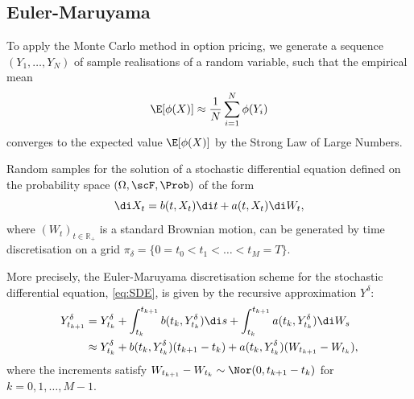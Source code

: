 \subsection{Euler-Maruyama}

To apply the Monte Carlo method in option pricing, we generate a sequence $(Y_1, \dots, Y_N)$ of sample realisations of a random variable, such that the empirical mean
\begin{equation}
    \E [\phi(X)] \approx \frac{1}{N} \sum_{i=1}^{N} \phi(Y_i)
    \label{eq:MonteCarloEstimator}
\end{equation}
converges to the expected value $\E [\phi(X)]$ by the Strong Law of Large Numbers.

Random samples for the solution of a stochastic differential equation defined on the probability space $(\Omega, \scF, \Prob)$ of the form
\begin{equation}
    \di X_t = b(t, X_t) \di t + a(t, X_t) \di W_t,
    \label{eq:SDE}
\end{equation}
where $(W_t)_{t\in\mathbb{R}_+}$ is a standard Brownian motion, can be generated by time discretisation on a grid $\pi_{\delta} = \{0 = t_0 < t_1 < \dots < t_M = T\}$.

More precisely, the Euler-Maruyama discretisation scheme for the stochastic differential equation, \cref{eq:SDE}, is given by the recursive approximation $Y^\delta$:
\begin{align}
    Y_{t_{k+1}}^{\delta} &= Y_{t_{k}}^{\delta} + \int_{t_{k}}^{t_{k+1}} b(t_k, Y^\delta_{t_k}) \di s + \int_{t_{k}}^{t_{k+1}} a(t_k, Y^\delta_{t_k}) \di W_s \notag \\
    &\approx Y_{t_{k}}^{\delta} + b(t_k, Y_{t_{k}}^{\delta}) (t_{k+1} - t_k) + a(t_k, Y_{t_{k}}^{\delta}) (W_{t_{k+1}} - W_{t_k}),
    \label{eq:EulerScheme}
\end{align}
where the increments satisfy $W_{t_{k+1}} - W_{t_k} \sim \Nor (0,t_{k+1} - t_{k})$ for $k = 0,1,\dots,M-1$.

